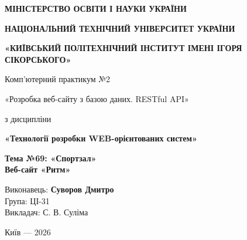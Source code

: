 \documentclass[12pt,a4paper]{article}
\newcommand{\AuthorName}{Суворов Дмитро}
\newcommand{\StudentGroup}{ЦІ-31}
\begin{document}
\begin{titlepage}\thispagestyle{empty}\centering
{\small\sffamily\bfseries МІНІСТЕРСТВО ОСВІТИ І НАУКИ УКРАЇНИ}\par\vspace{5mm}
{\small\sffamily\bfseries НАЦІОНАЛЬНИЙ ТЕХНІЧНИЙ УНІВЕРСИТЕТ УКРАЇНИ}\par
{\small\sffamily\bfseries «КИЇВСЬКИЙ ПОЛІТЕХНІЧНИЙ ІНСТИТУТ ІМЕНІ ІГОРЯ СІКОРСЬКОГО»}\par
{}\par\vspace{7mm}
{\Large Комп'ютерний практикум №2}\par\vspace{5mm}
{\large «Розробка веб-сайту з базою даних. RESTful API»}\par\vspace{12mm}
з дисципліни\par\medskip
{\large\bfseries «Технології розробки WEB-орієнтованих систем»}\par\vspace{15mm}
\begin{infobox}\centering\large\bfseries Тема №69: «Спортзал»\\Веб-сайт «Ритм»\end{infobox}
\vfill\begin{flushright}Виконавець: \textbf{\AuthorName}\\Група: \StudentGroup\\Викладач: С. В. Суліма\end{flushright}\vfill
Київ --- 2026
\end{titlepage}
\tableofcontents\clearpage
\end{document}

